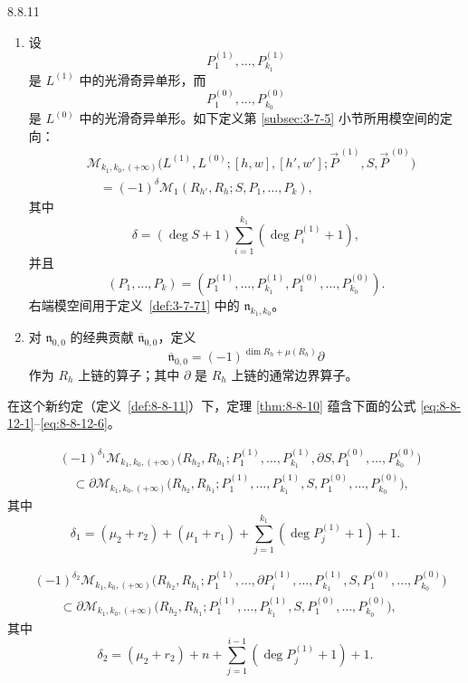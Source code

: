 \begin{definition}{8.8.11}\label{def:8-8-11}
\begin{enumerate}[label=(\arabic*),leftmargin=2.8em]
\item 设
\[
 P_1^{(1)},\ldots,P_{k_1}^{(1)}
\]
是 $L^{(1)}$ 中的光滑奇异单形，而
\[
 P_1^{(0)},\ldots,P_{k_0}^{(0)}
\]
是 $L^{(0)}$ 中的光滑奇异单形。如下定义第
\ref{subsec:3-7-5} 小节所用模空间的定向：
\[
\begin{aligned}
 &\mathcal M_{k_1,k_0,(+\infty)}
 \bigl(
 L^{(1)},L^{(0)};[h,w],[h',w'];
 \vec P^{\,(1)},S,\vec P^{\,(0)}
 \bigr)\\
 &\quad=
 (-1)^\delta
 \mathcal M_1(R_{h'},R_h;S,P_1,\ldots,P_k),
\end{aligned}
\]
其中
\[
 \delta=(\deg S+1)
 \sum_{i=1}^{k_1}(\deg P_i^{(1)}+1),
\]
并且
\[
 (P_1,\ldots,P_k)
 =
 (P_1^{(1)},\ldots,P_{k_1}^{(1)},
  P_1^{(0)},\ldots,P_{k_0}^{(0)}).
\]
右端模空间用于定义~\ref{def:3-7-71} 中的
$\mathfrak n_{k_1,k_0}$。

\item 对 $\mathfrak n_{0,0}$ 的经典贡献
$\overline{\mathfrak n}_{0,0}$，定义
\[
 \overline{\mathfrak n}_{0,0}
 =
 (-1)^{\dim R_h+\mu(R_h)}\partial
\]
作为 $R_h$ 上链的算子；其中 $\partial$ 是 $R_h$ 上链的通常边界算子。
\end{enumerate}
\end{definition}

在这个新约定（定义~\ref{def:8-8-11}）下，定理
\ref{thm:8-8-10} 蕴含下面的公式
\eqref{eq:8-8-12-1}--\eqref{eq:8-8-12-6}。

\begin{equation}
\begin{aligned}
 &(-1)^{\delta_1}
 \mathcal M_{k_1,k_0,(+\infty)}
 \bigl(
 R_{h_2},R_{h_1};
 P_1^{(1)},\ldots,P_{k_1}^{(1)},
 \partial S,
 P_1^{(0)},\ldots,P_{k_0}^{(0)}
 \bigr)\\
 &\quad\subset
 \partial\mathcal M_{k_1,k_0,(+\infty)}
 \bigl(
 R_{h_2},R_{h_1};
 P_1^{(1)},\ldots,P_{k_1}^{(1)},
 S,
 P_1^{(0)},\ldots,P_{k_0}^{(0)}
 \bigr),
\end{aligned}
\tag{8.8.12.1}\label{eq:8-8-12-1}
\end{equation}
其中
\[
 \delta_1=(\mu_2+r_2)+(\mu_1+r_1)
 +\sum_{j=1}^{k_1}(\deg P_j^{(1)}+1)+1.
\]

\begin{equation}
\begin{aligned}
 &(-1)^{\delta_2}
 \mathcal M_{k_1,k_0,(+\infty)}
 \bigl(
 R_{h_2},R_{h_1};
 P_1^{(1)},\ldots,\partial P_i^{(1)},\ldots,P_{k_1}^{(1)},
 S,P_1^{(0)},\ldots,P_{k_0}^{(0)}
 \bigr)\\
 &\qquad\subset
 \partial\mathcal M_{k_1,k_0,(+\infty)}
 \bigl(
 R_{h_2},R_{h_1};
 P_1^{(1)},\ldots,P_{k_1}^{(1)},
 S,P_1^{(0)},\ldots,P_{k_0}^{(0)}
 \bigr),
\end{aligned}
\tag{8.8.12.2}\label{eq:8-8-12-2}
\end{equation}
其中
\[
 \delta_2=(\mu_2+r_2)+n
 +\sum_{j=1}^{i-1}(\deg P_j^{(1)}+1)+1.
\]

